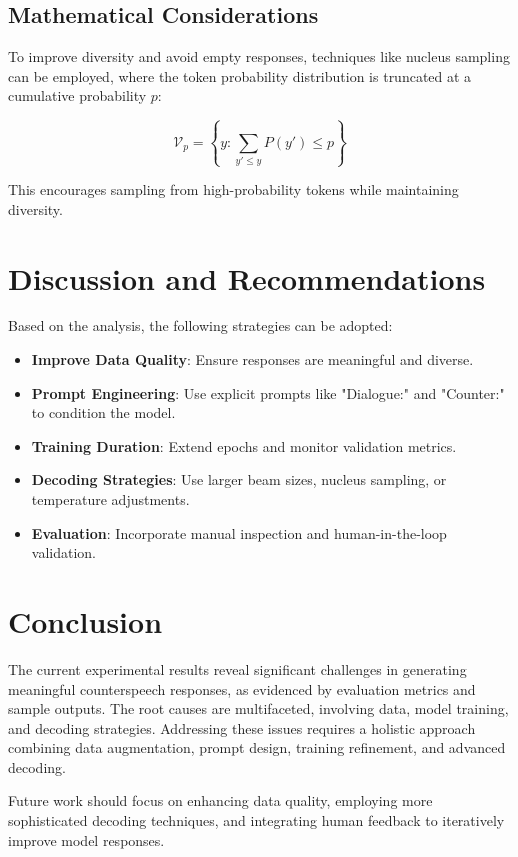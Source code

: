 \documentclass[12pt]{article}
\begin{document}
\subsection{Mathematical Considerations}
To improve diversity and avoid empty responses, techniques like nucleus sampling \cite{holtzman2019curious} can be employed, where the token probability distribution is truncated at a cumulative probability \( p \):

\begin{equation}
\mathcal{V}_p = \left\{ y : \sum_{y' \leq y} P(y') \leq p \right\}
\end{equation}

This encourages sampling from high-probability tokens while maintaining diversity.

\section{Discussion and Recommendations}
Based on the analysis, the following strategies can be adopted:

\begin{itemize}
\item \textbf{Improve Data Quality}: Ensure responses are meaningful and diverse.
\item \textbf{Prompt Engineering}: Use explicit prompts like "Dialogue:" and "Counter:" to condition the model.
\item \textbf{Training Duration}: Extend epochs and monitor validation metrics.
\item \textbf{Decoding Strategies}: Use larger beam sizes, nucleus sampling, or temperature adjustments.
\item \textbf{Evaluation}: Incorporate manual inspection and human-in-the-loop validation.
\end{itemize}

\section{Conclusion}
The current experimental results reveal significant challenges in generating meaningful counterspeech responses, as evidenced by evaluation metrics and sample outputs. The root causes are multifaceted, involving data, model training, and decoding strategies. Addressing these issues requires a holistic approach combining data augmentation, prompt design, training refinement, and advanced decoding.

Future work should focus on enhancing data quality, employing more sophisticated decoding techniques, and integrating human feedback to iteratively improve model responses.
\end{document}
